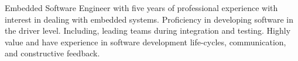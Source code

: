 \begin{cvletter}


Embedded Software Engineer with five years of professional experience with interest in dealing with embedded systems. Proficiency in developing software in the driver level. Including, leading teams during integration and testing. Highly value and have experience in software development life-cycles, communication, and constructive feedback. %


\end{cvletter}